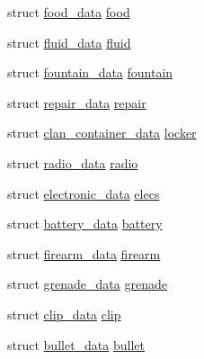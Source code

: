 \begin{DoxyCompactItemize}
\item 
struct \hyperlink{structfood__data}{food\-\_\-data} \hyperlink{unionobj__info_ae4467830a38c1e6d5169f237922db4ab}{food}
\item 
struct \hyperlink{structfluid__data}{fluid\-\_\-data} \hyperlink{unionobj__info_a1e3b2278b83873c4aef4f8480176a110}{fluid}
\item 
struct \hyperlink{structfountain__data}{fountain\-\_\-data} \hyperlink{unionobj__info_a4b2609633e61c3c77c8ef1bebdd14bd3}{fountain}
\item 
struct \hyperlink{structrepair__data}{repair\-\_\-data} \hyperlink{unionobj__info_afefb2169a824b50e34e562ee46750598}{repair}
\item 
struct \hyperlink{structclan__container__data}{clan\-\_\-container\-\_\-data} \hyperlink{unionobj__info_acc86008678fa13348f1fdc418932f42c}{locker}
\item 
struct \hyperlink{structradio__data}{radio\-\_\-data} \hyperlink{unionobj__info_ac82a26a47808bdba4fd6675c9c7e4ee6}{radio}
\item 
struct \hyperlink{structelectronic__data}{electronic\-\_\-data} \hyperlink{unionobj__info_a33226a98e933ef6ce4575cc79ef471a3}{elecs}
\item 
struct \hyperlink{structbattery__data}{battery\-\_\-data} \hyperlink{unionobj__info_a309b79c3adbc4e1fa3afa0b53c1a08bb}{battery}
\item 
struct \hyperlink{structfirearm__data}{firearm\-\_\-data} \hyperlink{unionobj__info_a5da8ed829db1d77e1e69aad0bc84e7fc}{firearm}
\item 
struct \hyperlink{structgrenade__data}{grenade\-\_\-data} \hyperlink{unionobj__info_a4aa6f3fa4d6f8e47c0e5c2f06d3a1822}{grenade}
\item 
struct \hyperlink{structclip__data}{clip\-\_\-data} \hyperlink{unionobj__info_acc99009097df8afe28a196266eb1624c}{clip}
\item 
struct \hyperlink{structbullet__data}{bullet\-\_\-data} \hyperlink{unionobj__info_acf2324b3d090ccafc9bf528a2165cabc}{bullet}
\end{DoxyCompactItemize}



